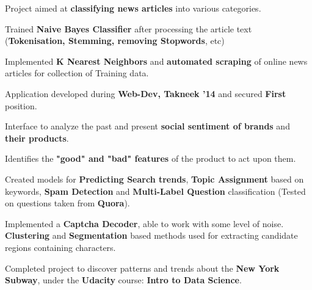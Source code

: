 \documentclass[a4paper]{norm-resume}
\begin{document}
	\vspace{2mm}
		
	   
	\begin{tightitemize}
	\small
	{
	\item Project aimed at \textbf{classifying news articles} into various categories.
	\item Trained \textbf{Naive Bayes Classifier} after processing the article text (\textbf{Tokenisation, Stemming, removing Stopwords}, etc)
	\item Implemented \textbf{K Nearest Neighbors} and \textbf{automated scraping} of online news articles for collection of Training data.
	}
	\end{tightitemize}
 		
	\vspace{2mm}
	
	   \descript{Aug' 14}
	\begin{tightitemize}
	\small
	{
	\item Application developed during \textbf{Web-Dev, Takneek '14} and secured \textbf{First} position.
	\item Interface to analyze the past and present \textbf{social sentiment of brands} and \textbf{their products}.
	\item Identifies the \textbf{"good" and "bad" features} of the product to act upon them.
	}
	\end{tightitemize}
 		
	\vspace{2mm}
	
			\descript{\null}
	\begin{tightitemize}
	\small
	{
	\item Created models for \textbf{Predicting Search trends}, \textbf{Topic Assignment} based on keywords, \textbf{Spam Detection} and \textbf{Multi-Label Question} classification (Tested on questions taken from \textbf{Quora}).
	\item Implemented a \textbf{Captcha Decoder}, able to work with some level of noise. \textbf{Clustering} and \textbf{Segmentation} based methods used for extracting candidate regions containing characters.
	\item Completed project to discover patterns and trends about the \textbf{New York Subway}, under the \textbf{Udacity} course: \textbf{Intro to Data Science}.
	}
	\end{tightitemize}		
\end{document}
